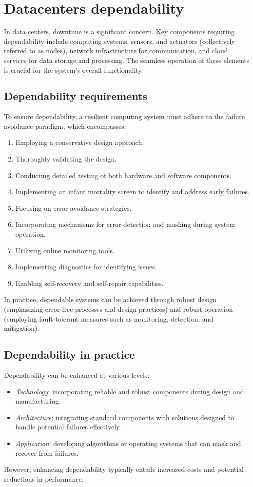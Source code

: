 \section{Datacenters dependability}

In data centers, downtime is a significant concern. 
Key components requiring dependability include computing systems, sensors, and actuators (collectively referred to as nodes), network infrastructure for communication, and cloud services for data storage and processing. 
The seamless operation of these elements is crucial for the system's overall functionality.

\subsection{Dependability requirements}
To ensure dependability, a resilient computing system must adhere to the failure avoidance paradigm, which encompasses:
\begin{enumerate}
    \item Employing a conservative design approach.
    \item Thoroughly validating the design.
    \item Conducting detailed testing of both hardware and software components.
    \item Implementing an infant mortality screen to identify and address early failures.
    \item Focusing on error avoidance strategies.
    \item Incorporating mechanisms for error detection and masking during system operation.
    \item Utilizing online monitoring tools.
    \item Implementing diagnostics for identifying issues.
    \item Enabling self-recovery and self-repair capabilities.
\end{enumerate}
In practice, dependable systems can be achieved through robust design (emphasizing error-free processes and design practices) and robust operation (employing fault-tolerant measures such as monitoring, detection, and mitigation).

\subsection{Dependability in practice}
Dependability can be enhanced at various levels:
\begin{itemize}
    \item \textit{Technology}: incorporating reliable and robust components during design and manufacturing.
    \item \textit{Architecture}: integrating standard components with solutions designed to handle potential failures effectively.
    \item \textit{Application}: developing algorithms or operating systems that can mask and recover from failures.
\end{itemize}
However, enhancing dependability typically entails increased costs and potential reductions in performance.

